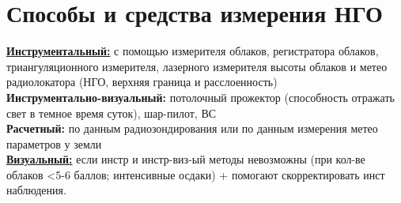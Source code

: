 
\section{Способы и средства измерения НГО}
\underline{\textbf{Инструментальный:}} с помощью измерителя облаков, регистратора облаков, триангуляционного измерителя, лазерного измерителя высоты облаков и метео радиолокатора (НГО, верхняя граница и расслоенность)\\
\textbf{Инструментально-визуальный:} потолочный прожектор (способность отражать свет в темное время суток), шар-пилот, ВС\\
\textbf{Расчетный:} по данным радиозондирования или по данным измерения метео параметров у земли\\

\underline{\textbf{Визуальный:}} если инстр и инстр-виз-ый методы невозможны (при кол-ве облаков <5-6 баллов; интенсивные осдаки) + помогают скорректировать инст наблюдения.